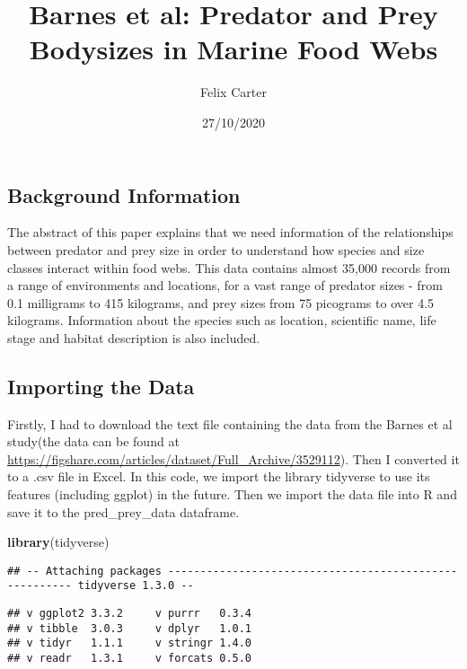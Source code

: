 \documentclass[
]{article}
\title{Barnes et al: Predator and Prey Bodysizes in Marine Food Webs}
\author{Felix Carter}
\date{27/10/2020}
\newenvironment{Shaded}{\begin{snugshade}}{\end{snugshade}}
\newcommand{\KeywordTok}[1]{\textcolor[rgb]{0.13,0.29,0.53}{\textbf{#1}}}
\newcommand{\NormalTok}[1]{#1}
\begin{document}
\maketitle

\hypertarget{background-information}{%
\subsection{Background Information}\label{background-information}}

The abstract of this paper explains that we need information of the
relationships between predator and prey size in order to understand how
species and size classes interact within food webs. This data contains
almost 35,000 records from a range of environments and locations, for a
vast range of predator sizes - from 0.1 milligrams to 415 kilograms, and
prey sizes from 75 picograms to over 4.5 kilograms. Information about
the species such as location, scientific name, life stage and habitat
description is also included.

\hypertarget{importing-the-data}{%
\subsection{Importing the Data}\label{importing-the-data}}

Firstly, I had to download the text file containing the data from the
Barnes et al study(the data can be found at
\url{https://figshare.com/articles/dataset/Full_Archive/3529112}). Then
I converted it to a .csv file in Excel. In this code, we import the
library tidyverse to use its features (including ggplot) in the future.
Then we import the data file into R and save it to the pred\_prey\_data
dataframe.

\begin{Shaded}
\begin{Highlighting}[]
\KeywordTok{library}\NormalTok{(tidyverse)}
\end{Highlighting}
\end{Shaded}

\begin{verbatim}
## -- Attaching packages ------------------------------------------------------- tidyverse 1.3.0 --
\end{verbatim}

\begin{verbatim}
## v ggplot2 3.3.2     v purrr   0.3.4
## v tibble  3.0.3     v dplyr   1.0.1
## v tidyr   1.1.1     v stringr 1.4.0
## v readr   1.3.1     v forcats 0.5.0
\end{verbatim}
\end{document}
